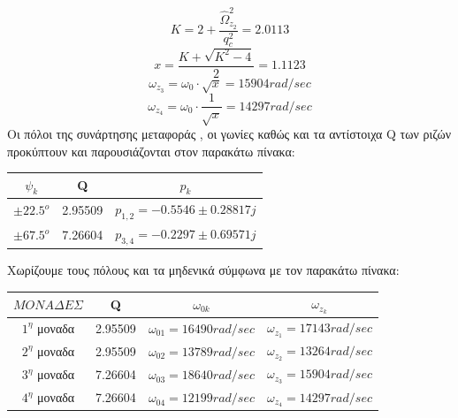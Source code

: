 \documentclass{article}
\begin{document}
{\begin{equation*}
K = 2 + \frac{\hat{Ω}_{z_2}^2}{q_c^2} = 2.0113
\end{equation*}
\begin{equation*}
x = \frac{K + \sqrt{K^2-4}}{2} = 1.1123
\end{equation*}
\begin{equation*}
ω_{z_3} = ω_0 \cdot \sqrt{x} =15904 rad/sec
\end{equation*}
\begin{equation*}
ω_{z_4} = ω_0 \cdot \frac{1}{\sqrt{x}} = 14297 rad/sec
\end{equation*}
Οι πόλοι της συνάρτησης μεταφοράς , οι γωνίες καθώς και τα αντίστοιχα Q των ριζών προκύπτουν και παρουσιάζονται στον παρακάτω πίνακα:

 \begin{center}

 \begin{tabular}{|c|c|c|}
        \hline
       \qquad $ψ_k$ \qquad \qquad &\qquad \qquad Q \qquad \qquad \qquad & \qquad \qquad $p_k$ \qquad \qquad \qquad \\
       
        \hline
        $\pm22.5^o$ & 2.95509 & $p_{1,2} = -0.5546 \pm 0.28817j$\\
        \hline
        $\pm67.5^o$ & 7.26604 & $p_{3,4} = -0.2297 \pm 0.69571j$\\
        \hline
        \end{tabular}
\end{center}

Χωρίζουμε τους πόλους και τα μηδενικά σύμφωνα με τον παρακάτω πίνακα:

\begin{center}
\begin{changemargin}{-1.6cm}{0.5cm} 
 \begin{tabular}{|c|c|c|c|}
        \hline
        $ΜΟΝΑΔΕΣ$  & \qquad Q  \qquad \qquad & \qquad \qquad $ω_{0k}$ \qquad \qquad \qquad & \qquad \qquad $ω_{z_k}$ \qquad \qquad \qquad  \\
       
        \hline
        $1^η$ μοναδα  & 2.95509 & $ ω_{01} = 16490 rad/sec$ & $ ω_{z_1} = 17143 rad/sec$ \\
        \hline
        $2^η$ μοναδα& 2.95509 & $ω_{02} = 13789 rad/sec$ &$ ω_{z_2} = 13264 rad/sec$\\
        \hline
$3^η$ μοναδα& 7.26604 & $ω_{03} = 18640 rad/sec$ &$ ω_{z_3} = 15904 rad/sec$\\
        \hline
        $4^η$ μοναδα& 7.26604 & $ω_{04} = 12199 rad/sec$&$ ω_{z_4} = 14297 rad/sec$\\
        \hline
                

\end{tabular}
\end{changemargin}
\end{center}}
\end{document}
